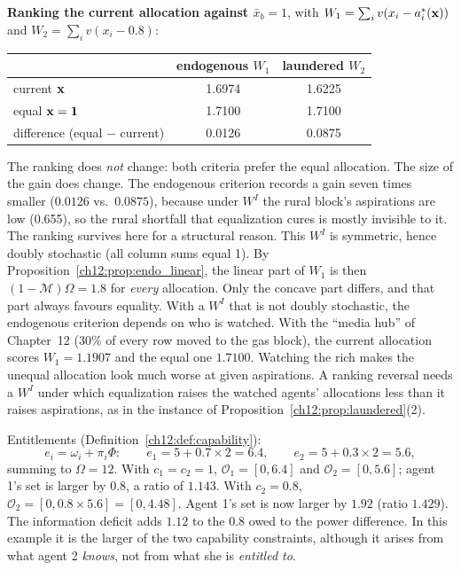 \documentclass[../solutions_manual.tex]{subfiles}
\begin{document}
\textbf{Ranking the current allocation against $\bar x_b = 1$}, with $W_1 = \sum_i v(x_i - a_i^*(\mathbf{x}))$ and $W_2 = \sum_i v(x_i - 0.8)$:
\begin{center}
\begin{tabular}{lcc}
\toprule
& endogenous $W_1$ & laundered $W_2$ \\
\midrule
current $\mathbf{x}$ & 1.6974 & 1.6225 \\
equal $\mathbf{x} = \mathbf{1}$ & 1.7100 & 1.7100 \\
difference (equal $-$ current) & 0.0126 & 0.0875 \\
\bottomrule
\end{tabular}
\end{center}
The ranking does \emph{not} change: both criteria prefer the equal allocation. The size of the gain does change. The endogenous criterion records a gain seven times smaller ($0.0126$ vs.\ $0.0875$), because under $W^I$ the rural block's aspirations are low (0.655), so the rural shortfall that equalization cures is mostly invisible to it. The ranking survives here for a structural reason. This $W^I$ is symmetric, hence doubly stochastic (all column sums equal 1). By Proposition~\ref{ch12:prop:endo_linear}, the linear part of $W_1$ is then $(1-\mathcal{M})\Omega = 1.8$ for \emph{every} allocation. Only the concave part differs, and that part always favours equality. With a $W^I$ that is not doubly stochastic, the endogenous criterion depends on who is watched. With the ``media hub'' of Chapter~12 (30\% of every row moved to the gas block), the current allocation scores $W_1 = 1.1907$ and the equal one $1.7100$. Watching the rich makes the unequal allocation look much worse at given aspirations. A ranking reversal needs a $W^I$ under which equalization raises the watched agents' allocations less than it raises aspirations, as in the instance of Proposition~\ref{ch12:prop:laundered}(2).

Entitlements (Definition~\ref{ch12:def:capability}):
\[
e_i = \omega_i + \pi_i\Phi:\qquad e_1 = 5 + 0.7\times 2 = 6.4, \qquad e_2 = 5 + 0.3\times 2 = 5.6,
\]
summing to $\Omega = 12$. With $c_1 = c_2 = 1$, $\mathcal{O}_1 = [0, 6.4]$ and $\mathcal{O}_2 = [0, 5.6]$; agent 1's set is larger by $0.8$, a ratio of $1.143$. With $c_2 = 0.8$, $\mathcal{O}_2 = [0, 0.8\times 5.6] = [0, 4.48]$. Agent 1's set is now larger by $1.92$ (ratio $1.429$). The information deficit adds $1.12$ to the $0.8$ owed to the power difference. In this example it is the larger of the two capability constraints, although it arises from what agent 2 \emph{knows}, not from what she is \emph{entitled to}.
\end{document}
